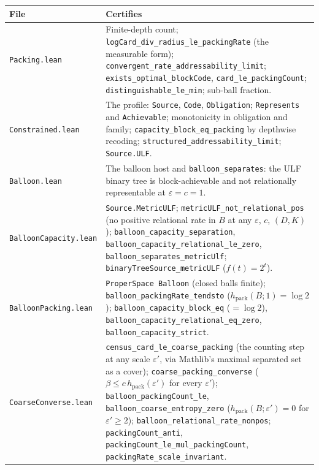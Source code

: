 \documentclass[11pt,a4paper]{article}
\theoremstyle{plain}
\theoremstyle{definition}
\theoremstyle{remark}
\newcommand{\hpack}{h_{\mathrm{pack}}}
\begin{document}
{\footnotesize
\begin{longtable}{@{}>{\raggedright\arraybackslash}p{4.3cm}>{\raggedright\arraybackslash}p{10.6cm}@{}}
\toprule
\textbf{File} & \textbf{Certifies} \\
\midrule
\texttt{Packing.lean} & Finite-depth count; \texttt{logCard\_\allowbreak{}div\_\allowbreak{}radius\_\allowbreak{}le\_\allowbreak{}packingRate} (the measurable form); \texttt{convergent\_\allowbreak{}rate\_\allowbreak{}addressability\_\allowbreak{}limit}; \texttt{exists\_\allowbreak{}optimal\_\allowbreak{}blockCode}, \texttt{card\_\allowbreak{}le\_\allowbreak{}packingCount}; \texttt{distinguishable\_\allowbreak{}le\_\allowbreak{}min}; sub-ball fraction. \\
\texttt{Constrained.lean} & The profile: \texttt{Source}, \texttt{Code}, \texttt{Obligation}; \texttt{Represents} and \texttt{Achievable}; monotonicity in obligation and family; \texttt{capacity\_\allowbreak{}block\_\allowbreak{}eq\_\allowbreak{}packing} by depthwise recoding; \texttt{structured\_\allowbreak{}addressability\_\allowbreak{}limit}; \texttt{Source.ULF}. \\
\texttt{Balloon.lean} & The balloon host and \texttt{balloon\_\allowbreak{}separates}: the ULF binary tree is block-achievable and not relationally representable at $\varepsilon=c=1$. \\
\texttt{BalloonCapacity.lean} & \texttt{Source.MetricULF}; \texttt{metricULF\_\allowbreak{}not\_\allowbreak{}relational\_\allowbreak{}pos} (no positive relational rate in $B$ at any $\varepsilon$, $c$, $(D,K)$); \texttt{balloon\_\allowbreak{}capacity\_\allowbreak{}separation}, \texttt{balloon\_\allowbreak{}capacity\_\allowbreak{}relational\_\allowbreak{}le\_\allowbreak{}zero}, \texttt{balloon\_\allowbreak{}separates\_\allowbreak{}metricUlf}; \texttt{binaryTreeSource\_\allowbreak{}metricULF} ($f(t)=2^t$). \\
\texttt{BalloonPacking.lean} & \texttt{ProperSpace Balloon} (closed balls finite); \texttt{balloon\_\allowbreak{}packingRate\_\allowbreak{}tendsto} ($\hpack(B;1)=\log2$); \texttt{balloon\_\allowbreak{}capacity\_\allowbreak{}block\_\allowbreak{}eq} ($=\log2$), \texttt{balloon\_\allowbreak{}capacity\_\allowbreak{}relational\_\allowbreak{}eq\_\allowbreak{}zero}, \texttt{balloon\_\allowbreak{}capacity\_\allowbreak{}strict}. \\
\texttt{CoarseConverse.lean} & \texttt{census\_\allowbreak{}card\_\allowbreak{}le\_\allowbreak{}coarse\_\allowbreak{}packing} (the counting step at any scale $\varepsilon'$, via Mathlib's maximal separated set as a cover); \texttt{coarse\_\allowbreak{}packing\_\allowbreak{}converse} ($\beta\le c\,\hpack(\varepsilon')$ for every $\varepsilon'$); \texttt{balloon\_\allowbreak{}packingCount\_\allowbreak{}le}, \texttt{balloon\_\allowbreak{}coarse\_\allowbreak{}entropy\_\allowbreak{}zero} ($\hpack(B;\varepsilon')=0$ for $\varepsilon'\ge2$); \texttt{balloon\_\allowbreak{}relational\_\allowbreak{}rate\_\allowbreak{}nonpos}; \texttt{packingCount\_\allowbreak{}anti}, \texttt{packingCount\_\allowbreak{}le\_\allowbreak{}mul\_\allowbreak{}packingCount}, \texttt{packingRate\_\allowbreak{}scale\_\allowbreak{}invariant}. \\

\end{longtable}}
\end{document}
